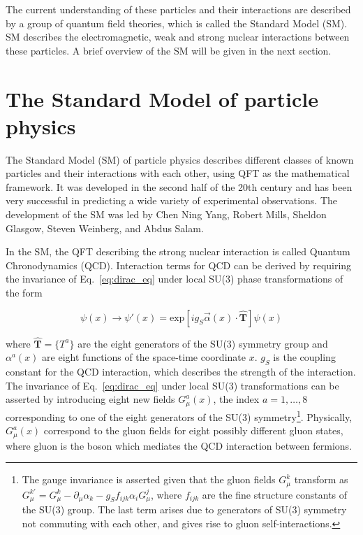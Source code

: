 The current understanding of these particles and their interactions are described by a group of quantum
field theories, which is called the Standard Model (SM). SM describes the electromagnetic, weak and 
strong nuclear interactions between these particles. A brief overview of the SM will be given in the
next section.

\section{The Standard Model of particle physics}

The Standard Model (SM) of particle physics describes different classes of known particles and their interactions
with each other, using QFT as the mathematical framework. It was developed in the second half of the 20th century
and has been very successful in predicting a wide variety of experimental observations. The development of the SM
was led by Chen Ning Yang, Robert Mills, Sheldon Glasgow, Steven Weinberg, and Abdus Salam.

In the SM, the QFT describing the strong nuclear interaction is called Quantum Chronodynamics (QCD). 
Interaction terms for QCD can be derived by requiring the invariance of Eq.~\ref{eq:dirac_eq} under 
local SU(3) phase transformations of the form

\begin{equation}
    \psi(x) \rightarrow \psi'(x) = \text{exp} \left[ i g_S \vec{\alpha}(x) \cdot \hat{\mathbf{T}}  \right]  \psi(x)
\end{equation}

where $\hat{\mathbf{T}} = \{ T^a \}$ are the eight generators of the SU(3) symmetry group and $\alpha^a(x)$ are eight functions
of the space-time coordinate $x$. $g_{S}$ is the coupling constant for the QCD interaction, which describes the strength
of the interaction.
The invariance of Eq.~\ref{eq:dirac_eq} under local SU(3) transformations can be asserted by introducing eight new fields
$G_{\mu}^{a}(x)$, the index $a = 1, \dots, 8$ corresponding to one of the eight generators of the SU(3) 
symmetry\footnote{The gauge invariance is asserted given that the gluon fields $G_{\mu}^{k}$ transform as
$G_{\mu}^{k'} = G_{\mu}^{k} - \partial_{\mu}\alpha_{k} - g_{S}f_{ijk}\alpha_{i}G_{\mu}^{j}$, where $f_{ijk}$ are
the fine structure constants of the SU(3) group. The last term arises due to generators of SU(3) symmetry not commuting
with each other, and gives rise to gluon self-interactions.}. Physically,
$G_{\mu}^{a}(x)$ correspond to the gluon fields for eight possibly different gluon states, where gluon is the boson which
mediates the QCD interaction between 
fermions.

